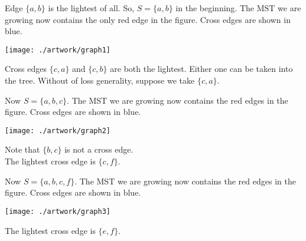 \documentclass{beamer}
\def\vgap{\vspace{5mm}}
\begin{document}
\begin{frame}
\begin{small}

    Edge $\{a, b\}$ is the lightest of all. So, $S = \{a, b\}$ in the beginning. The MST we are growing now contains the only red edge in the figure. Cross edges are shown in blue.

    
    
    \begin{center} 
        \texttt{[image: ./artwork/graph1]} 
    \end{center}
    
    Cross edges $\{c, a\}$ and $\{c, b\}$ are both the lightest. Either one can be taken into the tree. Without of loss generality, suppose we take $\{c, a\}$.

\end{small}    
\end{frame}
\begin{frame}
\begin{small}

    Now $S = \{a, b, c\}$. The MST we are growing now contains the red edges in the figure. Cross edges are shown in blue.

    \vgap
    
    \begin{center} 
        \texttt{[image: ./artwork/graph2]} 
    \end{center}

    Note that $\{b, c\}$ is not a cross edge. \\
    The lightest cross edge is $\{c, f\}$.
\end{small}    
\end{frame}
\begin{frame}
\begin{small}

    Now $S = \{a, b, c, f\}$. The MST we are growing now contains the red edges in the figure. Cross edges are shown in blue.

    \vgap
    
    \begin{center} 
        \texttt{[image: ./artwork/graph3]} 
    \end{center}

    The lightest cross edge is $\{e, f\}$.

\end{small}    
\end{frame}
\end{document}
